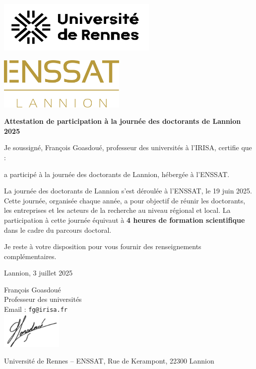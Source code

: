 \documentclass[12pt,a4paper]{article}
\begin{document}
\begin{minipage}[t]{0.45\textwidth}
    \includegraphics[height=2.5cm]{logo_rennes.png}
\end{minipage}
\hfill
\begin{minipage}[t]{0.45\textwidth}
    \raggedleft
    \includegraphics[height=2.5cm]{logo_enssat.png}
\end{minipage}

\vspace{1.5cm}

\begin{center}
    {\LARGE\bfseries Attestation de participation à la journée des doctorants de Lannion 2025}
\end{center}

\vspace{1.5cm}

Je soussigné, François Goasdoué, professeur des universités à l'IRISA, certifie que :\\

\vspace{0.5cm}


\vspace{0.5cm}

a participé à la journée des doctorants de Lannion, hébergée à l’ENSSAT.

La journée des doctorants de Lannion s’est déroulée à l’ENSSAT, le 19 juin 2025. Cette journée, organisée chaque année, a pour objectif de réunir les doctorants, les entreprises et les acteurs de la recherche au niveau régional et local. La participation à cette journée équivaut à \textbf{4 heures de formation scientifique} dans le cadre du parcours doctoral.


\vspace{1cm}

Je reste à votre disposition pour vous fournir des renseignements complémentaires.

\vspace{1.5cm}

\begin{flushright}
Lannion, 3 juillet 2025

François Goasdoué\\
Professeur des universités\\
Email : \texttt{fg@irisa.fr}\\
\includegraphics[height=1.75cm]{signature.png}


\end{flushright}

\vfill

{\small
Université de Rennes – ENSSAT, Rue de Kerampont, 22300 Lannion \\
}
\end{document}
